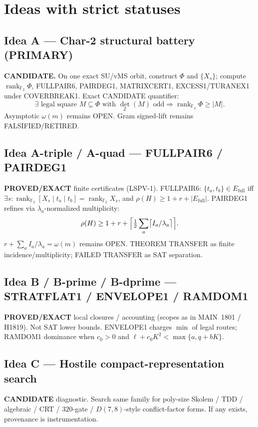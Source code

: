 \documentclass[11pt]{article}
\begin{document}
\section*{Ideas with strict statuses}
\subsection*{Idea A --- Char-2 structural battery (PRIMARY)}
\textbf{CANDIDATE.} On one exact SU/vMS orbit, construct $\Phi$ and $\{X_s\}$;
compute $\operatorname{rank}_{\mathbb F_2}\Phi$, FULLPAIR6, PAIRDEG1, MATRIXCERT1,
EXCESS1/TURANEX1 under COVERBREAK1. Exact CANDIDATE quantifier:
\[
\exists\text{ legal square }M\subseteq\Phi\text{ with }\det_{\mathbb Z}(M)\text{ odd}
\Rightarrow\operatorname{rank}_{\mathbb F_2}\Phi\ge|M|.
\]
Asymptotic $\omega(m)$ remains OPEN. Gram signed-lift remains FALSIFIED/RETIRED.

\subsection*{Idea A-triple / A-quad --- FULLPAIR6 / PAIRDEG1}
\textbf{PROVED/EXACT} finite certificates (LSPV-1). FULLPAIR6:
$\{t_a,t_b\}\in E_{\mathrm{full}}$ iff $\exists s:
\operatorname{rank}_{\mathbb F_2}[X_s\mid t_a\mid t_b]=\operatorname{rank}_{\mathbb F_2}X_s$,
and $\rho(H)\ge 1+r+|E_{\mathrm{full}}|$. PAIRDEG1 refines via
$\lambda_a$-normalized multiplicity:
\[
\rho(H)\ge 1+r+\Bigl\lceil\tfrac12\sum_a\bigl\lceil I_a/\lambda_a\bigr\rceil\Bigr\rceil.
\]
$r+\sum_a I_a/\lambda_a=\omega(m)$ remains OPEN. THEOREM TRANSFER as finite
incidence/multiplicity; FAILED TRANSFER as SAT separation.

\subsection*{Idea B / B-prime / B-dprime --- STRATFLAT1 / ENVELOPE1 / RAMDOM1}
\textbf{PROVED/EXACT} local closures / accounting (scopes as in MAIN~1801 / H1819).
Not SAT lower bounds. ENVELOPE1 charges $\min$ of legal routes; RAMDOM1 dominance
when $c_0\gt 0$ and $\ell+c_0K^2\lt\max\{a,q+bK\}$.

\subsection*{Idea C --- Hostile compact-representation search}
\textbf{CANDIDATE} diagnostic. Search same family for poly-size Skolem / TDD /
algebraic / CRT / $320$-gate / $D(7,8)$-style conflict-factor forms. If any exists,
provenance is instrumentation.
\end{document}
